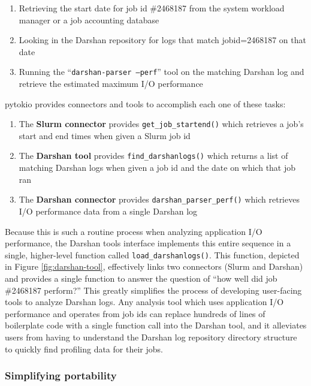 \begin{enumerate}[leftmargin=*]
\item Retrieving the start date for job id \#2468187 from the system workload manager or a job accounting database
\item Looking in the Darshan repository for logs that match jobid=2468187 on that date
\item Running the ``\texttt{darshan-parser --perf}'' tool on the matching Darshan log and retrieve the estimated maximum I/O performance
\end{enumerate}

pytokio provides connectors and tools to accomplish each one of these tasks:

\begin{enumerate}[leftmargin=*]
\item The \textbf{Slurm connector} provides \texttt{get\_job\_startend()} which retrieves a job's start and end times when given a Slurm job id
\item The \textbf{Darshan tool} provides \texttt{find\_darshanlogs()} which returns a list of matching Darshan logs when given a job id and the date on which that job ran
\item The \textbf{Darshan connector} provides \texttt{darshan\_parser\_perf()} which retrieves I/O performance data from a single Darshan log
\end{enumerate}

Because this is such a routine process when analyzing application I/O performance, the Darshan tools interface implements this entire sequence in a single, higher-level function called \texttt{load\_darshanlogs()}.
This function, depicted in Figure \ref{fig:darshan-tool}, effectively links two connectors (Slurm and Darshan) and provides a single function to answer the question of ``how well did job \#2468187 perform?''
This greatly simplifies the process of developing user-facing tools to analyze Darshan logs.
Any analysis tool which uses application I/O performance and operates from job ids can replace hundreds of lines of boilerplate code with a single function call into the Darshan tool, and it alleviates users from having to understand the Darshan log repository directory structure to quickly find profiling data for their jobs.

\subsubsection{Simplifying portability}

